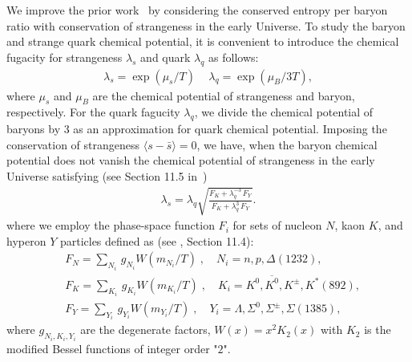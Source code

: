 We improve the prior work~\cite{Fromerth:2012fe} by considering the conserved entropy per baryon ratio with conservation of strangeness in the early Universe. To study the baryon and strange quark chemical potential, it is convenient to introduce the chemical fugacity for strangeness $\lambda_s$ and quark $\lambda_q$ as follows:
\begin{align}
\lambda_s=\exp(\mu_s/T)\,\quad \lambda_q=\exp(\mu_B/3T),
\end{align}
where $\mu_s$ and $\mu_B$ are the chemical potential of strangeness and baryon, respectively. For the quark fagucity $\lambda_q$, we divide the chemical potential of baryons by 3 as an approximation for quark chemical potential. Imposing the conservation of strangeness  
$\langle s-\bar s \rangle=0$, we have, when the baryon chemical potential does not vanish the chemical potential of strangeness in the early Universe satisfying (see Section 11.5 in \,\cite{Letessier:2002ony})
\begin{align}\label{museq}
\lambda_s=\lambda_q\sqrt{\frac{F_K+\lambda^{-3}_q\,F_Y}{F_K+\lambda^3_q\,F_Y}}.
\end{align}
where we employ the phase-space function $F_i$ for sets of nucleon $N$, kaon $K$, and hyperon $Y$ particles defined as (see \cite{Letessier:2002ony}, Section 11.4):
\begin{align}
&F_N=\sum_{N_i}\,g_{N_i}W(m_{N_i}/T)\;, \quad N_i=n, p, \Delta(1232),\\
&F_K=\sum_{K_i}\,g_{K_i}W(m_{K_i}/T)\;, \quad K_i=K^0, \overline{K^0}, K^\pm, K^\ast(892),\\
&F_Y=\sum_{Y_i}\,g_{Y_i}W(m_{Y_i}/T)\;, \quad Y_i=\Lambda, \Sigma^0,\Sigma^\pm, \Sigma(1385),
\end{align}
where $g_{N_i,K_i,Y_i}$ are the degenerate factors, $W(x)=x^2K_2(x)$ with $K_2$ is the modified Bessel functions of integer order "$2$".  

